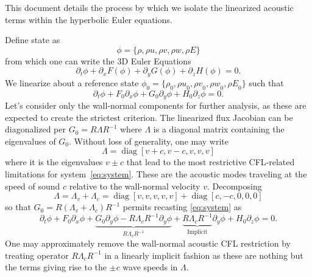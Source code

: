 \documentclass[letterpaper,11pt,nointlimits,reqno]{amsart}
\begin{document}
This document details the process by which we isolate the linearized
acoustic terms within the hyperbolic Euler equations.

Define state as
\begin{equation}
 \phi = \{\rho, \rho u, \rho v, \rho w, \rho E \}
\end{equation}
from which one can write the 3D Euler Equations
\begin{equation}
 \partial_t \phi + \partial_x F(\phi) + \partial_y G(\phi) + \partial_z
  H(\phi) = 0
  .
\end{equation}
We linearize about a reference state $\phi_0 = \{\rho_0, {\rho u}_0,
{\rho v}_0, {\rho w}_0, {\rho E}_0 \}$ such that
\begin{equation}\label{eq:system}
 \partial_t \phi +  F_0 \partial_x \phi + G_0 \partial_y \phi + H_0 \partial_z
  \phi = 0
  .
\end{equation}
Let's consider only the wall-normal components for further analysis, as these
are expected to create the strictest criterion.  The linearized flux Jacobian
can be diagonalized per $G_0 = R \Lambda R^{-1}$ where $\Lambda$ is a diagonal
matrix containing the eigenvalues of $G_0$.  Without loss of generality, one
may write
\begin{equation}
  \Lambda = \operatorname{diag}\left[v+c,v-c,v,v,v\right]
\end{equation}
where it is the eigenvalues $v\pm{}c$ that lead to the most restrictive
CFL-related limitations for system~\eqref{eq:system}.  These are the acoustic
modes traveling at the speed of sound $c$ relative to the wall-normal velocity
$v$.  Decomposing
\begin{equation}\label{eq:eigdecomp}
  \Lambda = \Lambda_v + \Lambda_c =
  \operatorname{diag}\left[v,v,v,v,v\right]
  +
  \operatorname{diag}\left[c,-c,0,0,0\right]
\end{equation}
so that $ G_0 = R \left(\Lambda_v + \Lambda_c\right) R^{-1} $ permits recasting
\eqref{eq:system} as
\begin{equation}
    \partial_t \phi
 +  F_0 \partial_x \phi
 +  \underbrace{
      G_0 \partial_y \phi - R \Lambda_c R^{-1} \partial_y \phi
    }_{R \Lambda_v R^{-1}}
 +  \underbrace{R \Lambda_c R^{-1}}_{\text{Implicit}} \partial_y \phi
 +  H_0 \partial_z \phi
  = 0
  .
\end{equation}
One may approximately remove the wall-normal acoustic CFL restriction by
treating operator $R \Lambda_c R^{-1}$ in a linearly implicit fashion as these
are nothing but the terms giving rise to the $\pm{}c$ wave speeds in $\Lambda$.
\end{document}
